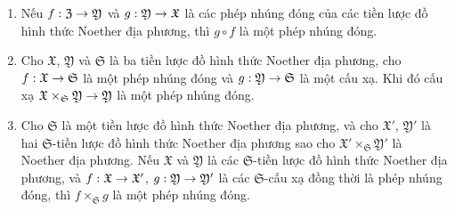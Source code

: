 \documentclass[oneside]{amsart}
\makeatletter
\newcommand{\ega@arrow}[2]{\mathchoice{#1}{#2}{#2}{#2}}
\renewcommand{\to}{\ega@arrow{\longrightarrow}{\rightarrow}}
\newcommand{\oldpage}[2][]{{\marginnote{\normalfont\textbf{#1}~|~#2}}\ignorespaces}
\let\EGAOriginalLabel\label
\renewcommand{\label}[1]{\phantomsection\EGAOriginalLabel{#1}}
\makeatother
\begin{document}
\begin{proposition}[10.14.5]
\label{I.10.14.5}
\medskip\noindent
\begin{enumerate}
  \item[\rm{(i)}] Nếu $f:\mathfrak{Z}\to\mathfrak{Y}$ và $g:\mathfrak{Y}\to\mathfrak{X}$ là các phép nhúng đóng của các tiền lược đồ hình thức Noether địa phương, thì $g\circ f$ là một phép nhúng đóng.
\oldpage[I]{211}
  \item[\rm{(ii)}] Cho $\mathfrak{X}$, $\mathfrak{Y}$ và $\mathfrak{S}$ là ba tiền lược đồ hình thức Noether địa phương, cho $f:\mathfrak{X}\to\mathfrak{S}$ là một phép nhúng đóng và $g:\mathfrak{Y}\to\mathfrak{S}$ là một cấu xạ.
    Khi đó cấu xạ $\mathfrak{X}\times_\mathfrak{S}\mathfrak{Y}\to\mathfrak{Y}$ là một phép nhúng đóng.
  \item[\rm{(iii)}] Cho $\mathfrak{S}$ là một tiền lược đồ hình thức Noether địa phương, và cho $\mathfrak{X}'$, $\mathfrak{Y}'$ là hai $\mathfrak{S}$-tiền lược đồ hình thức Noether địa phương sao cho $\mathfrak{X}'\times_\mathfrak{S}\mathfrak{Y}'$ là Noether địa phương.
    Nếu $\mathfrak{X}$ và $\mathfrak{Y}$ là các $\mathfrak{S}$-tiền lược đồ hình thức Noether địa phương, và $f:\mathfrak{X}\to\mathfrak{X}'$, $g:\mathfrak{Y}\to\mathfrak{Y}'$ là các $\mathfrak{S}$-cấu xạ đồng thời là phép nhúng đóng, thì $f\times_\mathfrak{S}g$ là một phép nhúng đóng.
\end{enumerate}
\end{proposition}
\end{document}
